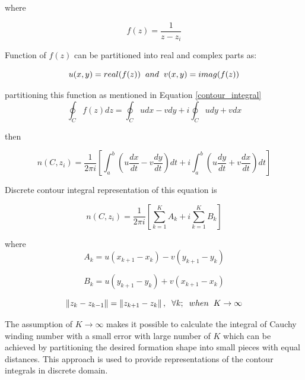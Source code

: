 where 

\begin{equation}
f(z) = \frac{1}{z-z_i}
\end{equation}
		
Function of $f(z)$ can be partitioned into real and complex parts as:

\begin{equation}
u(x,y) = real(f(z))  \hspace{0.2cm} and \hspace{0.2cm} v(x,y) = imag(f(z))
\end{equation}
		
partitioning this function as mentioned in Equation \ref{contour_integral}
\begin{equation}
\oint_C f(z)dz  = \oint_C u dx - v dy + i \oint_C u dy + v dx 
\end{equation}

then

\begin{equation}
n(C,z_i)  = \frac{1}{2\pi i} \left[\int_{a}^{b} \left(u\frac{dx}{dt} - v\frac{dy}{dt}\right)dt + i\int_{a}^{b}\left(u\frac{dy}{dt} + v\frac{dx}{dt}\right)dt\right]
\end{equation}
		
Discrete contour integral representation of this equation is
		
\begin{equation}
n(C,z_i)  = \frac{1}{2\pi i} {\left[\sum_{k=1}^{K} {A_k} + i\sum_{k=1}^{K} {B_k}\right]}
\end{equation}

where
\begin{equation}
A_k = u(x_{k+1} - x_k ) - v(y_{k+1} -y_k )
\end{equation}

\begin{equation}
B_k = u(y_{k+1} - y_k ) + v(x_{k+1} - x_k)
\end{equation}


\begin{equation}
\left\lVert z_k - z_{k-1}\right\rVert = \left\lVert z_{k+1} - z_k\right\rVert, \hspace{0.2cm}  \forall k ;  \hspace{0.2cm} when  \hspace{0.2cm} K \to\infty
\end{equation}

The assumption of $K \to\infty$ makes it possible to calculate the integral of Cauchy winding number with a small error with large number of $K$ which can be achieved by partitioning the desired formation shape  into small pieces with equal  distances. This approach is used to provide representations of the contour integrals in discrete domain. 

